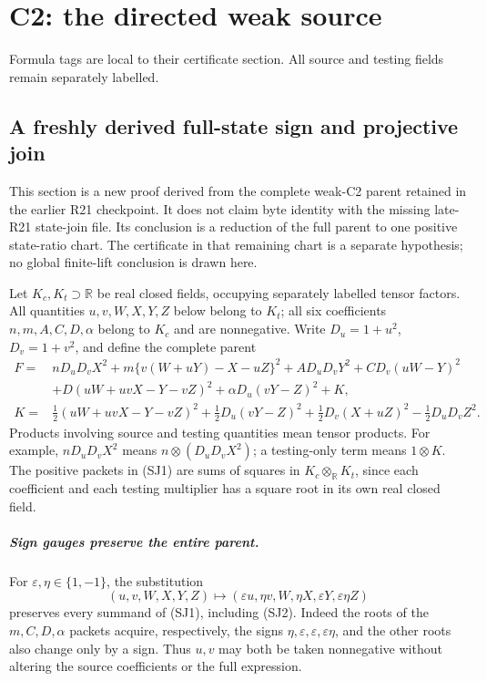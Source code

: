 \chapter{C2: the directed weak source}
\label{ch:cert-7}
Formula tags are local to their certificate section. All source and testing fields remain separately labelled.

\section{\texorpdfstring{A freshly derived full-state sign and projective join}{A freshly derived full-state sign and projective join}}
\label{component:pf77de02d80c4}

\label{pf77de02d80c4:sec:rederived-state-join}

This section is a new proof derived from the complete weak-C2 parent retained
in the earlier R21 checkpoint.  It does not claim byte identity with the
missing late-R21 state-join file.  Its conclusion is a reduction of the full
parent to one positive state-ratio chart.  The certificate in that remaining
chart is a separate hypothesis; no global finite-lift conclusion is drawn
here.

Let $K_c,K_t\supset\mathbb R$ be real closed fields, occupying separately
labelled tensor factors.  All quantities $u,v,W,X,Y,Z$ below belong to $K_t$;
all six coefficients $n,m,A,C,D,\alpha$ belong to $K_c$ and are nonnegative.
Write $D_u=1+u^2$, $D_v=1+v^2$, and define the complete parent
\begin{align}
 F={}&nD_uD_vX^2+m\{v(W+uY)-X-uZ\}^2
       +AD_uD_vY^2+CD_v(uW-Y)^2\\
    &+D(uW+uvX-Y-vZ)^2+\alpha D_u(vY-Z)^2+K,\tag{SJ1}\\
 K={}&\tfrac12(uW+uvX-Y-vZ)^2
       +\tfrac12D_u(vY-Z)^2
       +\tfrac12D_v(X+uZ)^2-\tfrac12D_uD_vZ^2.\tag{SJ2}
\end{align}
Products involving source and testing quantities mean tensor products.
For example, $nD_uD_vX^2$ means
$n\otimes(D_uD_vX^2)$; a testing-only term means $1\otimes K$.
The positive packets in (SJ1) are sums of squares in
$K_c\otimes_{\mathbb R}K_t$, since each coefficient and each testing
multiplier has a square root in its own real closed field.

\paragraph{Sign gauges preserve the entire parent.}
For $\varepsilon,\eta\in\{1,-1\}$, the substitution
\[
 (u,v,W,X,Y,Z)\longmapsto
 (\varepsilon u,\eta v,W,\eta X,\varepsilon Y,
  \varepsilon\eta Z)                                      \tag{SJ3}
\]
preserves every summand of (SJ1), including (SJ2).  Indeed the roots of the
$m,C,D,\alpha$ packets acquire, respectively, the signs
$\eta,\varepsilon,\varepsilon,\varepsilon\eta$, and the other roots also
change only by a sign.  Thus $u,v$ may both be taken nonnegative without
altering the source coefficients or the full expression.

